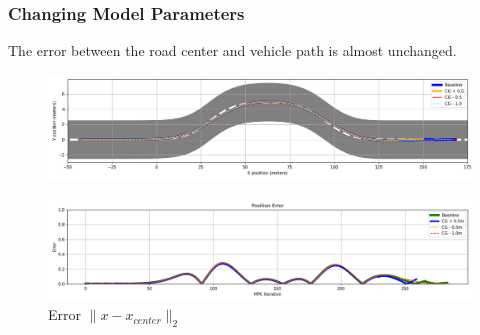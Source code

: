 \documentclass{beamer}
\begin{document}
\begin{frame}
\frametitle{Changing Model Parameters}

The error between the road center and vehicle path is almost unchanged.

\vspace{-0.5em}
\begin{figure}
	\centering
	\includegraphics[width=1.0\linewidth]{figures/road_paths_cg.png}
\end{figure}


\vspace{-1.5em}
\begin{figure}
	\centering
	\includegraphics[width=1.0\linewidth]{figures/errors_cg.png}
	\caption{Error $\|x-x_{center}\|_2$}
\end{figure}
\end{frame}
\end{document}

